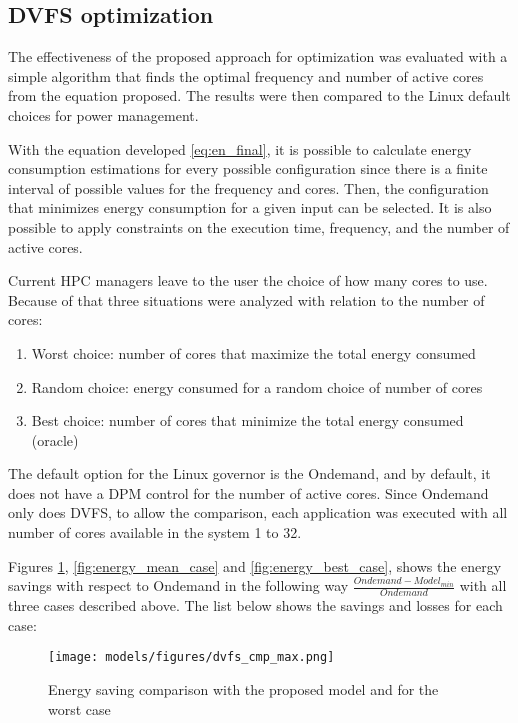 \subsection{DVFS optimization} \label{sec:dvfs_optmin}
The effectiveness of the proposed approach for optimization was evaluated with a simple algorithm that finds the optimal frequency and number of active cores from the equation proposed. The results were then compared to the Linux default choices for power management.

With the equation developed \ref{eq:en_final}, it is possible to calculate energy consumption estimations for every possible configuration since there is a finite interval of possible values for the frequency and cores. Then, the configuration that minimizes energy consumption for a given input can be selected. It is also possible to apply constraints on the execution time, frequency, and the number of active cores.

Current HPC managers leave to the user the choice of how many cores to use. Because of that three situations were analyzed with relation to the number of cores:

\begin{enumerate}
	\item Worst choice: number of cores that maximize the total energy consumed
	\item Random choice: energy consumed for a random choice of number of cores
	\item Best choice: number of cores that minimize the total energy consumed (oracle)
\end{enumerate}

The default option for the Linux governor is the Ondemand, and by default, it does not have a DPM control for the number of active cores. Since Ondemand only does DVFS, to allow the comparison, each application was executed with all number of cores available in the system 1 to 32.

Figures \ref{fig:energy_worst_case}, \ref{fig:energy_mean_case} and \ref{fig:energy_best_case}, shows the energy savings with respect to Ondemand in the following way $\frac{Ondemand-Model_{min}}{Ondemand}$ with all three cases described above. The list below shows the savings and losses for each case:


\begin{figure}[ht]
	\centering
	\texttt{[image: models/figures/dvfs\_cmp\_max.png]}
	\caption{Energy saving comparison with the proposed model and for the worst case}
	\label{fig:energy_worst_case}
\end{figure}

